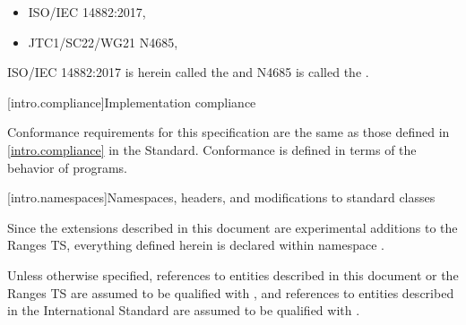 \begin{itemize}
\item ISO/IEC 14882:2017, 
\item JTC1/SC22/WG21 N4685, 
\end{itemize}

ISO/IEC 14882:2017 is herein called the \defn{C\Rplus\Rplus\xspace Standard} and N4685 is called
the .

[intro.compliance]{Implementation compliance}

\pnum
Conformance requirements for this specification are the same as those
defined in \ref{intro.compliance} in the \Cpp Standard.
\enternote
Conformance is defined in terms of the behavior of programs.
\exitnote

[intro.namespaces]{Namespaces, headers, and modifications to standard classes}

\pnum
Since the extensions described in this document are experimental additions to the Ranges TS,
everything defined herein is declared within namespace .

\pnum
Unless otherwise specified, references to entities described in this
document or the Ranges TS are assumed to be qualified with , and
references to entities described in the International Standard are assumed to be
qualified with .
